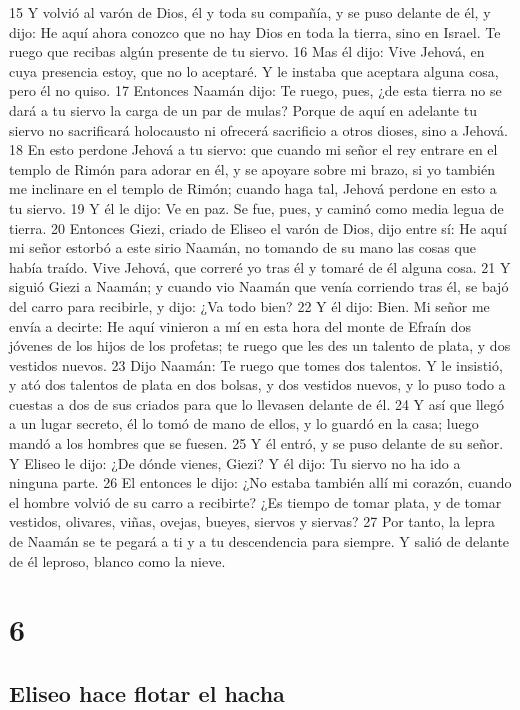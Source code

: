 15 Y volvió al varón de Dios, él y toda su compañía, y se puso delante de él, y dijo: He aquí ahora conozco que no hay Dios en toda la tierra, sino en Israel. Te ruego que recibas algún presente de tu siervo. 
16 Mas él dijo: Vive Jehová, en cuya presencia estoy, que no lo aceptaré. Y le instaba que aceptara alguna cosa, pero él no quiso.
17 Entonces Naamán dijo: Te ruego, pues, ¿de esta tierra no se dará a tu siervo la carga de un par de mulas? Porque de aquí en adelante tu siervo no sacrificará holocausto ni ofrecerá sacrificio a otros dioses, sino a Jehová.
18 En esto perdone Jehová a tu siervo: que cuando mi señor el rey entrare en el templo de Rimón para adorar en él, y se apoyare sobre mi brazo, si yo también me inclinare en el templo de Rimón; cuando haga tal, Jehová perdone en esto a tu siervo.
19 Y él le dijo: Ve en paz. Se fue, pues, y caminó como media legua de tierra.
20 Entonces Giezi, criado de Eliseo el varón de Dios, dijo entre sí: He aquí mi señor estorbó a este sirio Naamán, no tomando de su mano las cosas que había traído. Vive Jehová, que correré yo tras él y tomaré de él alguna cosa.
21 Y siguió Giezi a Naamán; y cuando vio Naamán que venía corriendo tras él, se bajó del carro para recibirle, y dijo: ¿Va todo bien?
22 Y él dijo: Bien. Mi señor me envía a decirte: He aquí vinieron a mí en esta hora del monte de Efraín dos jóvenes de los hijos de los profetas; te ruego que les des un talento de plata,  y dos vestidos nuevos.
23 Dijo Naamán: Te ruego que tomes dos talentos.  Y le insistió, y ató dos talentos de plata en dos bolsas, y dos vestidos nuevos, y lo puso todo a cuestas a dos de sus criados para que lo llevasen delante de él.
24 Y así que llegó a un lugar secreto, él lo tomó de mano de ellos, y lo guardó en la casa; luego mandó a los hombres que se fuesen.
25 Y él entró, y se puso delante de su señor. Y Eliseo le dijo: ¿De dónde vienes, Giezi? Y él dijo: Tu siervo no ha ido a ninguna parte.
26 El entonces le dijo: ¿No estaba también allí mi corazón, cuando el hombre volvió de su carro a recibirte? ¿Es tiempo de tomar plata, y de tomar vestidos, olivares, viñas, ovejas, bueyes, siervos y siervas?
27 Por tanto, la lepra de Naamán se te pegará a ti y a tu descendencia para siempre. Y salió de delante de él leproso, blanco como la nieve.

\chapter{6}

\section*{Eliseo hace flotar el hacha}


